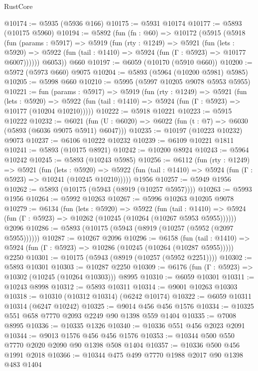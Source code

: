 \begin{lexlean}{RustCore}
\begin{coremodule}
@10174 := @5935 (@5936 @166)
@10175 := @5931 @10174
@10177 := @5893 (@10175 @5960)
@10194 := @5892
    (fun (fn : @60) =>
    @10172
      (@5915
        (@5918
          (fun (params : @5917) =>
          @5919
            (fun (rty : @1249) =>
            @5921
              (fun (lets : @5920) =>
              @5922 (fun (tail : @1410) => @5924 (fun (Γ : @5923) => @10177 @6007))))))
        @6053))
    @660
@10197 := @6059 (@10170 (@5910 @660))
@10200 := @5972 (@5973 @660) @9075
@10204 := @5893 (@5964 (@10200 @5981) @5985)
@10205 := @5998 @660
@10210 := @5995 (@5997 @10205 @9078 @5953 @5955)
@10221 := fun (params : @5917) =>
  @5919
    (fun (rty : @1249) =>
    @5921
      (fun (lets : @5920) =>
      @5922 (fun (tail : @1410) => @5924 (fun (Γ : @5923) => @10177 (@10204 @10210)))))
@10222 := @5918 @10221
@10223 := @5915 @10222
@10232 := @6021 (fun (U : @6020) => @6022 (fun (t : @7) => @6030 (@5893 (@6036 @9075 @5911) @6047)))
@10235 := @10197 (@10223 @10232) @9073
@10237 := @6106 @10222 @10232
@10239 := @6109 @10221 @1811
@10241 := @5893 (@10175 @8921)
@10242 := @10200 @8924
@10243 := @5964 @10242
@10245 := @5893 (@10243 @5985)
@10256 := @6112
    (fun (rty : @1249) =>
    @5921
      (fun (lets : @5920) =>
      @5922 (fun (tail : @1410) => @5924 (fun (Γ : @5923) => @10241 (@10245 @10210)))))
    @1956
@10257 := @5949 @1956
@10262 := @5893 (@10175 (@5943 (@8919 (@10257 @5957))))
@10263 := @5993 @1956
@10264 := @5992 @10263
@10267 := @5996 @10263 @10205 @9078
@10279 := @6134
    (fun (lets : @5920) =>
    @5922
      (fun (tail : @1410) =>
      @5924 (fun (Γ : @5923) => @10262 (@10245 (@10264 (@10267 @5953 @5955))))))
    @2096
@10286 := @5893 (@10175 (@5943 (@8919 (@10257 (@5952 (@2097 @5955))))))
@10287 := @10267 @2096
@10296 := @6158
    (fun (tail : @1410) => @5924 (fun (Γ : @5923) => @10286 (@10245 (@10264 (@10287 @5955)))))
    @2250
@10301 := @10175 (@5943 (@8919 (@10257 (@5952 @2251))))
@10302 := @5893 @10301
@10303 := @10287 @2250
@10309 := @6176 (fun (Γ : @5923) => @10302 (@10245 (@10264 @10303))) @8995
@10310 := @6059 @10301
@10311 := @10243 @8998
@10312 := @5893 @10311
@10314 := @9001 @10263 @10303
@10318 := @10310 (@10312 @10314) (@6242 @10174)
@10322 := @6059 @10311 @10314 (@6247 @10242)
@10325 := @9014 @456 @456 @1576
@10334 := @10325 @551 @658 @7770 @2093 @2249 @90 @1398 @559 @1404
@10335 := @7008 @8995
@10336 := @10335 @1326
@10340 := @10336 @551 @456 @2023 @2091
@10344 := @9013 @1576 @456 @456 @1576
@10353 := @10344 @500 @550 @7770 @2020 @2090 @90 @1398 @508 @1404
@10357 := @10336 @500 @456 @1991 @2018
@10366 := @10344 @475 @499 @7770 @1988 @2017 @90 @1398 @483 @1404

\end{coremodule}
\end{lexlean}
